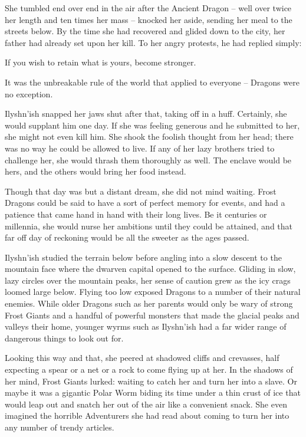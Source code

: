  

She tumbled end over end in the air after the Ancient Dragon – well over twice her length and ten times her mass – knocked her aside, sending her meal to the streets below. By the time she had recovered and glided down to the city, her father had already set upon her kill. To her angry protests, he had replied simply:

 

If you wish to retain what is yours, become stronger.

 

It was the unbreakable rule of the world that applied to everyone – Dragons were no exception.

 

Ilyshn’ish snapped her jaws shut after that, taking off in a huff. Certainly, she would supplant him one day. If she was feeling generous and he submitted to her, she might not even kill him. She shook the foolish thought from her head; there was no way he could be allowed to live. If any of her lazy brothers tried to challenge her, she would thrash them thoroughly as well. The enclave would be hers, and the others would bring her food instead.

 

Though that day was but a distant dream, she did not mind waiting. Frost Dragons could be said to have a sort of perfect memory for events, and had a patience that came hand in hand with their long lives. Be it centuries or millennia, she would nurse her ambitions until they could be attained, and that far off day of reckoning would be all the sweeter as the ages passed.

 

Ilyshn’ish studied the terrain below before angling into a slow descent to the mountain face where the dwarven capital opened to the surface. Gliding in slow, lazy circles over the mountain peaks, her sense of caution grew as the icy crags loomed large below. Flying too low exposed Dragons to a number of their natural enemies. While older Dragons such as her parents would only be wary of strong Frost Giants and a handful of powerful monsters that made the glacial peaks and valleys their home, younger wyrms such as Ilyshn’ish had a far wider range of dangerous things to look out for.

 

Looking this way and that, she peered at shadowed cliffs and crevasses, half expecting a spear or a net or a rock to come flying up at her. In the shadows of her mind, Frost Giants lurked: waiting to catch her and turn her into a slave. Or maybe it was a gigantic Polar Worm biding its time under a thin crust of ice that would leap out and snatch her out of the air like a convenient snack. She even imagined the horrible Adventurers she had read about coming to turn her into any number of trendy articles.

